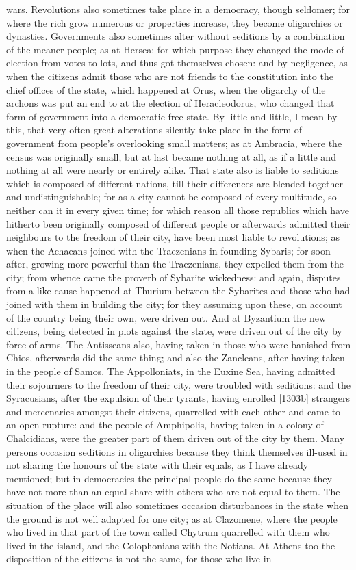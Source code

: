 \documentclass[12pt]{article}
\begin{document}
wars. Revolutions also sometimes take place in a democracy, though seldomer; for where the rich grow numerous or properties increase, they become oligarchies or dynasties. Governments also sometimes alter without seditions by a combination of the meaner people; as at Hersea: for which purpose they changed the mode of election from votes to lots, and thus got themselves chosen: and by negligence, as when the citizens admit those who are not friends to the constitution into the chief offices of the state, which happened at Orus, when the oligarchy of the archons was put an end to at the election of Heracleodorus, who changed that form of government into a democratic free state. By little and little, I mean by this, that very often great alterations silently take place in the form of government from people's overlooking small matters; as at Ambracia, where the census was originally small, but at last became nothing at all, as if a little and nothing at all were nearly or entirely alike. That state also is liable to seditions which is composed of different nations, till their differences are blended together and undistinguishable; for as a city cannot be composed of every multitude, so neither can it in every given time; for which reason all those republics which have hitherto been originally composed of different people or afterwards admitted their neighbours to the freedom of their city, have been most liable to revolutions; as when the Achaeans joined with the Traezenians in founding Sybaris; for soon after, growing more powerful than the Traezenians, they expelled them from the city; from whence came the proverb of Sybarite wickedness: and again, disputes from a like cause happened at Thurium between the Sybarites and those who had joined with them in building the city; for they assuming upon these, on account of the country being their own, were driven out. And at Byzantium the new citizens, being detected in plots against the state, were driven out of the city by force of arms. The Antisseans also, having taken in those who were banished from Chios, afterwards did the same thing; and also the Zancleans, after having taken in the people of Samos. The Appolloniats, in the Euxine Sea, having admitted their sojourners to the freedom of their city, were troubled with seditions: and the Syracusians, after the expulsion of their tyrants, having enrolled [1303b] strangers and mercenaries amongst their citizens, quarrelled with each other and came to an open rupture: and the people of Amphipolis, having taken in a colony of Chalcidians, were the greater part of them driven out of the city by them. Many persons occasion seditions in oligarchies because they think themselves ill-used in not sharing the honours of the state with their equals, as I have already mentioned; but in democracies the principal people do the same because they have not more than an equal share with others who are not equal to them. The situation of the place will also sometimes occasion disturbances in the state when the ground is not well adapted for one city; as at Clazomene, where the people who lived in that part of the town called Chytrum quarrelled with them who lived in the island, and the Colophonians with the Notians. At Athens too the disposition of the citizens is not the same, for those who live in 
\end{document}
